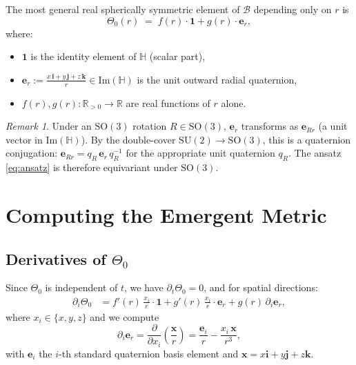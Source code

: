 \documentclass[11pt,a4paper]{article}
\theoremstyle{definition}
\theoremstyle{remark}
\newtheorem{remark}[theorem]{Remark}
\begin{document}
The most general real spherically symmetric element of $\mathcal{B}$
depending only on $r$ is
\begin{equation}
  \Theta_0(r)
  \;=\; f(r)\cdot\mathbf{1}
       + g(r)\cdot\boldsymbol{e}_r,
  \label{eq:ansatz}
\end{equation}
where:
\begin{itemize}
  \item $\mathbf{1}$ is the identity element of $\mathbb{H}$ (scalar part),
  \item $\boldsymbol{e}_r := \frac{x\,\mathbf{i} + y\,\mathbf{j} + z\,\mathbf{k}}{r}
        \in \mathrm{Im}(\mathbb{H})$ is the unit outward radial quaternion,
  \item $f(r), g(r): \mathbb{R}_{>0} \to \mathbb{R}$ are real functions
        of $r$ alone.
\end{itemize}

\begin{remark}
Under an $\mathrm{SO}(3)$ rotation $R \in \mathrm{SO}(3)$, $\boldsymbol{e}_r$
transforms as $\boldsymbol{e}_{Rr}$ (a unit vector in $\mathrm{Im}(\mathbb{H})$).
By the double-cover $\mathrm{SU}(2)\to\mathrm{SO}(3)$, this is a quaternion
conjugation: $\boldsymbol{e}_{Rr} = q_R\,\boldsymbol{e}_r\,q_R^{-1}$ for the
appropriate unit quaternion $q_R$.  The ansatz \eqref{eq:ansatz} is therefore
equivariant under $\mathrm{SO}(3)$.
\end{remark}

\section{Computing the Emergent Metric}
\label{sec:metric_compute}

\subsection{Derivatives of $\Theta_0$}

Since $\Theta_0$ is independent of $t$, we have $\partial_t\Theta_0 = 0$, and
for spatial directions:
\begin{align}
  \partial_i\Theta_0
  &= f'(r)\,\frac{x_i}{r}\cdot\mathbf{1}
   + g'(r)\,\frac{x_i}{r}\cdot\boldsymbol{e}_r
   + g(r)\,\partial_i\boldsymbol{e}_r,
  \label{eq:dTheta_spatial}
\end{align}
where $x_i \in \{x,y,z\}$ and we compute
\begin{equation}
  \partial_i\boldsymbol{e}_r
  = \frac{\partial}{\partial x_i}\left(\frac{\mathbf{x}}{r}\right)
  = \frac{\mathbf{e}_i}{r} - \frac{x_i\,\mathbf{x}}{r^3},
  \label{eq:dbolde_r}
\end{equation}
with $\mathbf{e}_i$ the $i$-th standard quaternion basis element and
$\mathbf{x} = x\mathbf{i}+y\mathbf{j}+z\mathbf{k}$.
\end{document}
